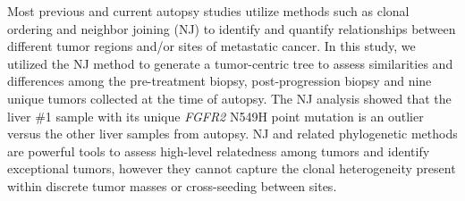 Most previous and current autopsy studies utilize methods such as clonal ordering \cite{merlo2006} and neighbor joining (NJ) \cite{saitou1987} to identify and quantify relationships between different tumor regions and/or sites of metastatic cancer. In this study, we utilized the NJ method to generate a tumor-centric tree to assess similarities and differences among the pre-treatment biopsy, post-progression biopsy and nine unique tumors collected at the time of autopsy. The NJ analysis showed that the liver \#1 sample with its unique \textit{FGFR2} N549H point mutation is an outlier versus the other liver samples from autopsy. NJ and related phylogenetic methods are powerful tools to assess high-level relatedness among tumors and identify exceptional tumors, however they cannot capture the clonal heterogeneity present within discrete tumor masses or cross-seeding between sites.


